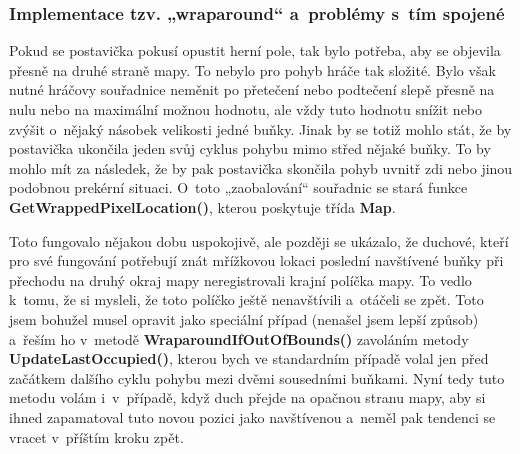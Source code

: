 \documentclass{article}
\begin{document}
\subsubsection{Implementace tzv. „wraparound“ a~problémy s~tím spojené} \label{wraparound}
Pokud se postavička pokusí opustit herní pole, tak bylo potřeba, aby se objevila přesně na druhé straně mapy. To nebylo pro pohyb hráče tak složité. Bylo však nutné hráčovy souřadnice neměnit po přetečení nebo podtečení slepě přesně na nulu nebo na maximální možnou hodnotu, ale vždy tuto hodnotu snížit nebo zvýšit o~nějaký násobek velikosti jedné buňky. Jinak by se totiž mohlo stát, že by postavička ukončila jeden svůj cyklus pohybu mimo střed nějaké buňky. To by mohlo mít za následek, že by pak postavička skončila pohyb uvnitř zdi nebo jinou podobnou prekérní situaci. O~toto „zaobalování“ souřadnic se stará funkce \textbf{GetWrappedPixelLocation()}, kterou poskytuje třída \textbf{Map}.

Toto fungovalo nějakou dobu uspokojivě, ale později se ukázalo, že duchové, kteří pro své fungování potřebují znát mřížkovou lokaci poslední navštívené buňky při přechodu na druhý okraj mapy neregistrovali krajní políčka mapy. To vedlo k~tomu, že si mysleli, že toto políčko ještě nenavštívili a~otáčeli se zpět. Toto jsem bohužel musel opravit jako speciální případ (nenašel jsem lepší způsob) a~řeším ho v~metodě \textbf{WraparoundIfOutOfBounds()} zavoláním metody \textbf{UpdateLastOccupied()}, kterou bych ve standardním případě volal jen před začátkem dalšího cyklu pohybu mezi dvěmi sousedními buňkami. Nyní tedy tuto metodu volám i~v~případě, když duch přejde na opačnou stranu mapy, aby si ihned zapamatoval tuto novou pozici jako navštívenou a~neměl pak tendenci se vracet v~příštím kroku zpět.
\end{document}
